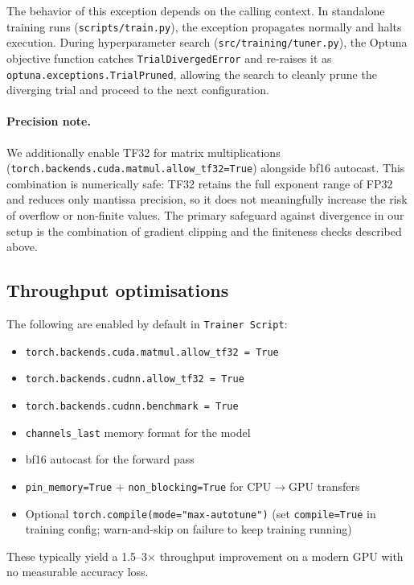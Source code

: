 \documentclass[10pt,a4paper]{article}
\begin{document}
The behavior of this exception depends on the calling context. In standalone
training runs (\texttt{scripts/train.py}), the exception propagates normally
and halts execution. During hyperparameter search
(\texttt{src/training/tuner.py}), the Optuna objective function catches
\texttt{TrialDivergedError} and re-raises it as
\texttt{optuna.exceptions.TrialPruned}, allowing the search to cleanly prune
the diverging trial and proceed to the next configuration.

\paragraph{Precision note.} We additionally enable TF32 for matrix
multiplications (\texttt{torch.backends.cuda.matmul.allow\_tf32=True}) alongside
bf16 autocast. This combination is numerically safe: TF32 retains the full
exponent range of FP32 and reduces only mantissa precision, so it does not
meaningfully increase the risk of overflow or non-finite values. The primary
safeguard against divergence in our setup is the combination of gradient
clipping and the finiteness checks described above.

\subsection{Throughput optimisations}

The following are enabled by default in \texttt{Trainer Script}:

\begin{itemize}[leftmargin=*]
  \item \texttt{torch.backends.cuda.matmul.allow\_tf32 = True}
  \item \texttt{torch.backends.cudnn.allow\_tf32 = True}
  \item \texttt{torch.backends.cudnn.benchmark = True}
  \item \texttt{channels\_last} memory format for the model
  \item bf16 autocast for the forward pass
  \item \texttt{pin\_memory=True} + \texttt{non\_blocking=True} for
        CPU$\to$GPU transfers
  \item Optional \texttt{torch.compile(mode="max-autotune")} (set
        \texttt{compile=True} in training config; warn-and-skip on
        failure to keep training running)
\end{itemize}

These typically yield a 1.5--3$\times$ throughput improvement on a
modern GPU with no measurable accuracy loss.
\end{document}
